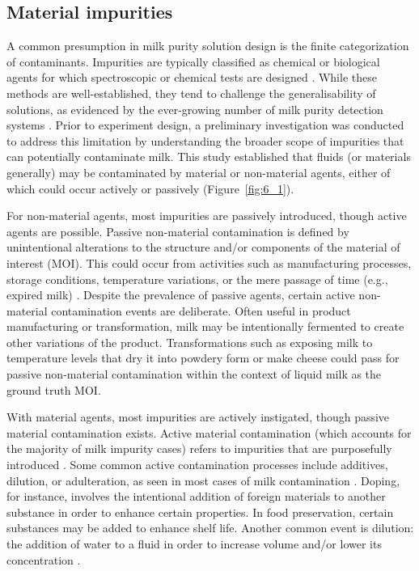 \documentclass[12pt,a4paper,oneside]{report}
\begin{document}
\subsection{Material impurities}
\label{subsec:material_impurities}

A common presumption in milk purity solution design is the finite categorization of contaminants. Impurities are typically classified as chemical or biological agents for which spectroscopic or chemical tests are designed \cite{joolaei2025}. While these methods are well-established, they tend to challenge the generalisability of solutions, as evidenced by the ever-growing number of milk purity detection systems \cite{joolaei2025,chandra2024}. Prior to experiment design, a preliminary investigation was conducted to address this limitation by understanding the broader scope of impurities that can potentially contaminate milk. This study established that fluids (or materials generally) may be contaminated by material or non-material agents, either of which could occur actively or passively (Figure~\ref{fig:6_1}).

For non-material agents, most impurities are passively introduced, though active agents are possible. Passive non-material contamination is defined by unintentional alterations to the structure and/or components of the material of interest (MOI). This could occur from activities such as manufacturing processes, storage conditions, temperature variations, or the mere passage of time (e.g., expired milk) \cite{lott2023,burgwald1947}. Despite the prevalence of passive agents, certain active non-material contamination events are deliberate. Often useful in product manufacturing or transformation, milk may be intentionally fermented to create other variations of the product. Transformations such as exposing milk to temperature levels that dry it into powdery form or make cheese could pass for passive non-material contamination within the context of liquid milk as the ground truth MOI.

With material agents, most impurities are actively instigated, though passive material contamination exists. Active material contamination (which accounts for the majority of milk impurity cases) refers to impurities that are purposefully introduced \cite{joolaei2025}. Some common active contamination processes include additives, dilution, or adulteration, as seen in most cases of milk contamination \cite{joolaei2025,chandra2024}. Doping, for instance, involves the intentional addition of foreign materials to another substance in order to enhance certain properties. In food preservation, certain substances may be added to enhance shelf life. Another common event is dilution: the addition of water to a fluid in order to increase volume and/or lower its concentration \cite{joolaei2025}.
\end{document}
